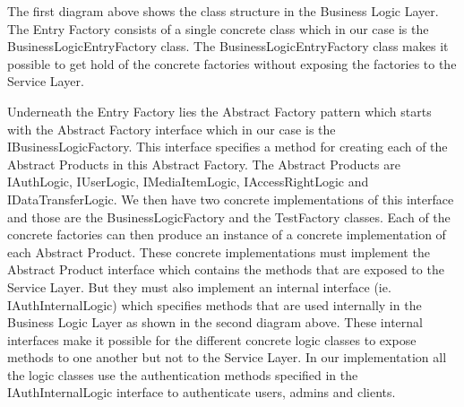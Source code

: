 \documentclass[../report.tex]{subfiles}
\begin{document}


\restoregeometry

The first diagram above shows the class structure in the Business Logic Layer. The Entry Factory consists of a single concrete class which in our case is the BusinessLogicEntryFactory class. The BusinessLogicEntryFactory class makes it possible to get hold of the concrete factories without exposing the factories to the Service Layer.

Underneath the Entry Factory lies the Abstract Factory pattern which starts with the Abstract Factory interface which in our case is the IBusinessLogicFactory. This interface specifies a method for creating each of the Abstract Products in this Abstract Factory. The Abstract Products are IAuthLogic, IUserLogic, IMediaItemLogic, IAccessRightLogic and IDataTransferLogic. We then have two concrete implementations of this interface and those are the BusinessLogicFactory and the TestFactory classes. Each of the concrete factories can then produce an instance of a concrete implementation of each Abstract Product. These concrete implementations must implement the Abstract Product interface which contains the methods that are exposed to the Service Layer. But they must also implement an internal interface (ie. IAuthInternalLogic) which specifies methods that are used internally in the Business Logic Layer as shown in the second diagram above. These internal interfaces make it possible for the different concrete logic classes to expose methods to one another but not to the Service Layer. In our implementation all the logic classes use the authentication methods specified in the IAuthInternalLogic interface to authenticate users, admins and clients.
\end{document}
